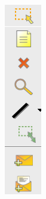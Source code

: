 \begin{minipage}{0.15\textwidth}
    \includegraphics[width=0.7\linewidth]{images/02.packet-tracer/right.png}
\end{minipage}

